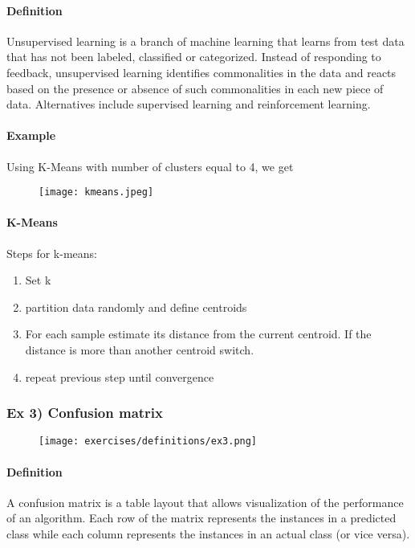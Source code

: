 \paragraph{Definition}
Unsupervised learning is a branch of machine learning that learns from test data that has not been labeled, classified or categorized. Instead of responding to feedback, unsupervised learning identifies commonalities in the data and reacts based on the presence or absence of such commonalities in each new piece of data. Alternatives include supervised learning and reinforcement learning. 

\paragraph{Example}
Using K-Means with number of clusters equal to 4, we get 

\begin{figure}[H]
    \centering
    \texttt{[image: kmeans.jpeg]}
\end{figure}

\paragraph{K-Means}
Steps for k-means:
\begin{enumerate}
\item Set k
\item partition data randomly and define centroids
\item For each sample estimate its distance from the current centroid. If the distance is more than another centroid switch.
\item repeat previous step until convergence
\end{enumerate}


\subsubsection{Ex 3) Confusion matrix }


\begin{figure}[H]
    \centering
    \texttt{[image: exercises/definitions/ex3.png]}
\end{figure}

\paragraph{Definition}
A confusion matrix is a table layout that allows visualization of the performance of an algorithm.  Each row of the matrix represents the instances in a predicted class while each column represents the instances in an actual class (or vice versa).

